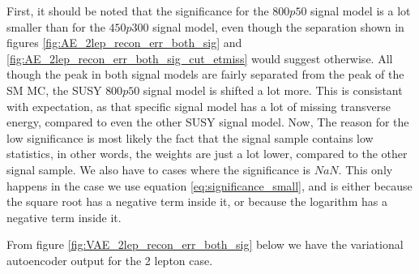 First, it should be noted that the significance for the $800p50$ signal model is a lot smaller than for the $450p300$ signal model, even though the separation shown in 
figures \ref{fig:AE_2lep_recon_err_both_sig} and \ref{fig:AE_2lep_recon_err_both_sig_cut_etmiss} would suggest otherwise. All though the peak in both signal models are 
fairly separated from the peak of the SM MC, the SUSY $800p50$ signal model is shifted a lot more. This is consistant with expectation, as that specific signal model 
has a lot of missing transverse energy, compared to even the other SUSY signal model. Now, The reason for the low significance is most likely the fact that the signal sample 
contains low statistics, in other words, the weights are just a lot lower, compared to the other signal sample. We also have to cases where the significance is $NaN$. 
This only happens in the case we use equation \ref{eq:significance_small}, and is either because the square root has a negative term inside it, or because the logarithm 
has a negative term inside it. \par

From figure \ref{fig:VAE_2lep_recon_err_both_sig} below we have the variational autoencoder output for the 2 lepton case. 

